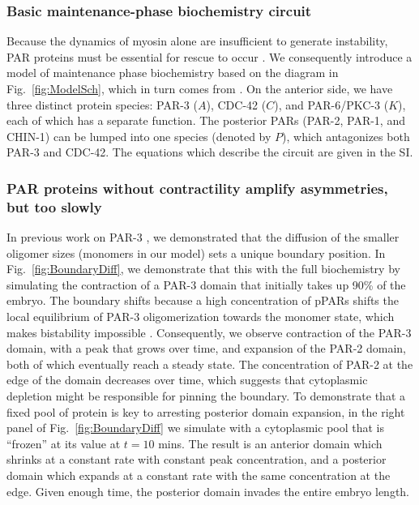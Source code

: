 \documentclass[11pt]{article}
\newcommand{\6}[1]{#1_{\text{6}}}
\newcommand{\3}[1]{#1_{\text{3}}}
\begin{document}
\subsubsection{Basic maintenance-phase biochemistry circuit \label{sec:BCOnly}}

Because the dynamics of myosin alone are insufficient to generate instability, PAR proteins must be essential for rescue to occur \citep{zonies2010symmetry}. We consequently introduce a model of maintenance phase biochemistry based on the diagram in Fig.\ \ref{fig:ModelSch}, which in turn comes from \citep[Fig.~2]{lang2017proteins}. On the anterior side, we have three distinct protein species: PAR-3 ($A$), CDC-42 ($C$), and PAR-6/PKC-3 ($K$), each of which has a separate function. The posterior PARs (PAR-2, PAR-1, and CHIN-1) can be lumped into one species (denoted by $P$), which antagonizes both PAR-3 and CDC-42. The equations which describe the circuit are given in the SI.

\subsubsection{PAR proteins without contractility amplify asymmetries, but too slowly}

In previous work on PAR-3 \citep{lang2023oligomerization}, we demonstrated that the diffusion of the smaller oligomer sizes (monomers in our model) sets a unique boundary position. In Fig.\ \ref{fig:BoundaryDiff}, we demonstrate that this with the full biochemistry by simulating the contraction of a PAR-3 domain that initially takes up 90\% of the embryo. The boundary shifts because a high concentration of pPARs shifts the local equilibrium of PAR-3 oligomerization towards the monomer state, which makes bistability impossible \citep{lang2023oligomerization}. Consequently, we observe contraction of the PAR-3 domain, with a peak that grows over time, and expansion of the PAR-2 domain, both of which eventually reach a steady state. The concentration of PAR-2 at the edge of the domain decreases over time, which suggests that cytoplasmic depletion might be responsible for pinning the boundary. To demonstrate that a fixed pool of protein is key to arresting posterior domain expansion, in the right panel of Fig.\ \ref{fig:BoundaryDiff} we simulate with a cytoplasmic pool that is ``frozen'' at its value at $t = 10$ mins. The result is an anterior domain which shrinks at a constant rate with constant peak concentration, and a posterior domain which expands at a constant rate with the same concentration at the edge. Given enough time, the posterior domain invades the entire embryo length. 
\end{document}
